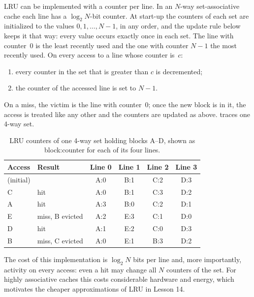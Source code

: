 \documentclass[../main.tex]{subfiles}
\begin{document}
LRU can be implemented with a counter per line.  In an $N$-way
set-associative cache each line has a $\log_2 N$-bit counter.  At start-up
the counters of each set are initialized to the values $0, 1, \ldots, N-1$,
in any order, and the update rule below keeps it that way: every value
occurs exactly once in each set.  The line with counter~0 is the least
recently used and the one with counter $N-1$ the most recently used.  On
every access to a line whose counter is~$c$:
\begin{enumerate}
  \item every counter in the set that is greater than $c$ is decremented;
  \item the counter of the accessed line is set to $N-1$.
\end{enumerate}
On a miss, the victim is the line with counter~0; once the new block is in
it, the access is treated like any other and the counters are updated as
above.   traces one 4-way set.

\begin{table}[htbp]
  \centering\small
  \caption{LRU counters of one 4-way set holding blocks A--D, shown as
    block:counter for each of its four lines.}
  \label{tab:l12-lru-trace}
  \begin{tabular}{@{}llcccc@{}}
    \toprule
    Access & Result & Line 0 & Line 1 & Line 2 & Line 3 \\
    \midrule
    (initial) &                     & A:0 & B:1 & C:2 & D:3 \\
    C         & hit                 & A:0 & B:1 & C:3 & D:2 \\
    A         & hit                 & A:3 & B:0 & C:2 & D:1 \\
    E         & miss, B evicted     & A:2 & E:3 & C:1 & D:0 \\
    D         & hit                 & A:1 & E:2 & C:0 & D:3 \\
    B         & miss, C evicted     & A:0 & E:1 & B:3 & D:2 \\
    \bottomrule
  \end{tabular}
\end{table}

The cost of this implementation is $\log_2 N$ bits per line and, more
importantly, activity on every access: even a hit may change all $N$
counters of the set.  For highly associative caches this costs considerable
hardware and energy, which motivates the cheaper approximations of LRU in
Lesson 14.
\end{document}
